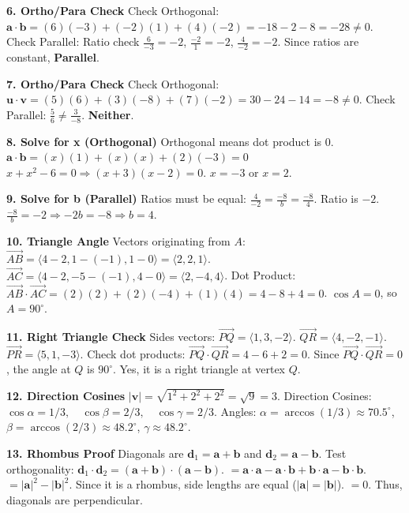 \documentclass[12pt]{article}
\begin{document}
\textbf{6. Ortho/Para Check}
Check Orthogonal: $\mathbf{a} \cdot \mathbf{b} = (6)(-3) + (-2)(1) + (4)(-2) = -18 - 2 - 8 = -28 \neq 0$.
Check Parallel: Ratio check $\frac{6}{-3} = -2$, $\frac{-2}{1} = -2$, $\frac{4}{-2} = -2$.
Since ratios are constant, \textbf{Parallel}.

\textbf{7. Ortho/Para Check}
Check Orthogonal: $\mathbf{u} \cdot \mathbf{v} = (5)(6) + (3)(-8) + (7)(-2) = 30 - 24 - 14 = -8 \neq 0$.
Check Parallel: $\frac{5}{6} \neq \frac{3}{-8}$.
\textbf{Neither}.

\textbf{8. Solve for x (Orthogonal)}
Orthogonal means dot product is 0.
$\mathbf{a} \cdot \mathbf{b} = (x)(1) + (x)(x) + (2)(-3) = 0$
$x + x^2 - 6 = 0 \Rightarrow (x+3)(x-2) = 0$.
$x = -3$ or $x = 2$.

\textbf{9. Solve for b (Parallel)}
Ratios must be equal: $\frac{4}{-2} = \frac{-8}{b} = \frac{-8}{4}$.
Ratio is $-2$.
$\frac{-8}{b} = -2 \Rightarrow -2b = -8 \Rightarrow b = 4$.

\textbf{10. Triangle Angle}
Vectors originating from $A$:
$\vec{AB} = \langle 4-2, 1-(-1), 1-0 \rangle = \langle 2, 2, 1 \rangle$.
$\vec{AC} = \langle 4-2, -5-(-1), 4-0 \rangle = \langle 2, -4, 4 \rangle$.
Dot Product: $\vec{AB} \cdot \vec{AC} = (2)(2) + (2)(-4) + (1)(4) = 4 - 8 + 4 = 0$.
$\cos A = 0$, so $A = 90^\circ$.

\textbf{11. Right Triangle Check}
Sides vectors:
$\vec{PQ} = \langle 1, 3, -2 \rangle$.
$\vec{QR} = \langle 4, -2, -1 \rangle$.
$\vec{PR} = \langle 5, 1, -3 \rangle$.
Check dot products:
$\vec{PQ} \cdot \vec{QR} = 4 - 6 + 2 = 0$.
Since $\vec{PQ} \cdot \vec{QR} = 0$, the angle at $Q$ is $90^\circ$.
Yes, it is a right triangle at vertex $Q$.

\textbf{12. Direction Cosines}
$|\mathbf{v}| = \sqrt{1^2+2^2+2^2} = \sqrt{9} = 3$.
Direction Cosines:
$\cos \alpha = 1/3, \quad \cos \beta = 2/3, \quad \cos \gamma = 2/3$.
Angles:
$\alpha = \arccos(1/3) \approx 70.5^\circ$, $\beta = \arccos(2/3) \approx 48.2^\circ$, $\gamma \approx 48.2^\circ$.

\textbf{13. Rhombus Proof}
Diagonals are $\mathbf{d}_1 = \mathbf{a} + \mathbf{b}$ and $\mathbf{d}_2 = \mathbf{a} - \mathbf{b}$.
Test orthogonality:
$\mathbf{d}_1 \cdot \mathbf{d}_2 = (\mathbf{a} + \mathbf{b}) \cdot (\mathbf{a} - \mathbf{b})$.
$= \mathbf{a} \cdot \mathbf{a} - \mathbf{a} \cdot \mathbf{b} + \mathbf{b} \cdot \mathbf{a} - \mathbf{b} \cdot \mathbf{b}$.
$= |\mathbf{a}|^2 - |\mathbf{b}|^2$.
Since it is a rhombus, side lengths are equal ($|\mathbf{a}| = |\mathbf{b}|$).
$= 0$. Thus, diagonals are perpendicular.
\end{document}
